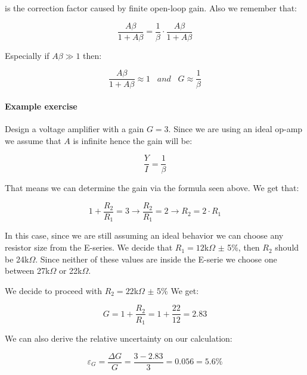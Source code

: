 \documentclass[../main.tex]{subfiles}
\begin{document}
is the correction factor caused by finite open-loop gain.
Also we remember that:

\begin{equation}
	\frac{A\beta}{1 + A\beta} = \frac{1}{\beta} \cdot \frac{A\beta}{1 + A\beta}
\end{equation}

Especially if $A\beta \gg 1$ then:

\begin{equation}
	\frac{A\beta}{1 + A\beta} \approx 1 \hspace{10pt} \unit{and} \hspace{10pt} G \approx \frac{1}{\beta}
\end{equation}

\paragraph{Example exercise}  Design a voltage amplifier with a gain $G = 3$. Since we are using an ideal op-amp we assume that $A$ is infinite hence the gain will be:

\begin{equation}
	\frac{Y}{I} = \frac{1}{\beta}
\end{equation}

That means we can determine the gain via the formula seen above. We get that:

\begin{equation}
	1 + \frac{R_2}{R_1} = 3 \rightarrow \frac{R_2}{R_1} = 2 \rightarrow R_2 = 2 \cdot R_1
\end{equation}

In this case, since we are still assuming an ideal behavior we can choose any resistor size from the E-series.
We decide that $R_1 = 12$k$\Omega$ $\pm$ 5\%, then $R_2$ should be 24k$\Omega$. Since neither of these values are inside the E-serie we choose one between 27k$\Omega$ or 22k$\Omega$.

We decide to proceed with $R_2 = 22$k$\Omega$ $\pm$ 5\%
We get:

\begin{equation}
	G = 1 + \frac{R_2}{R_1} = 1 + \frac{22}{12} = 2.83
\end{equation}

We can also derive the relative uncertainty on our calculation:

\begin{equation}
	\varepsilon_G = \frac{\Delta G}{G} = \frac{3 - 2.83}{3} = 0.056 = 5.6 \%
\end{equation}
\end{document}
